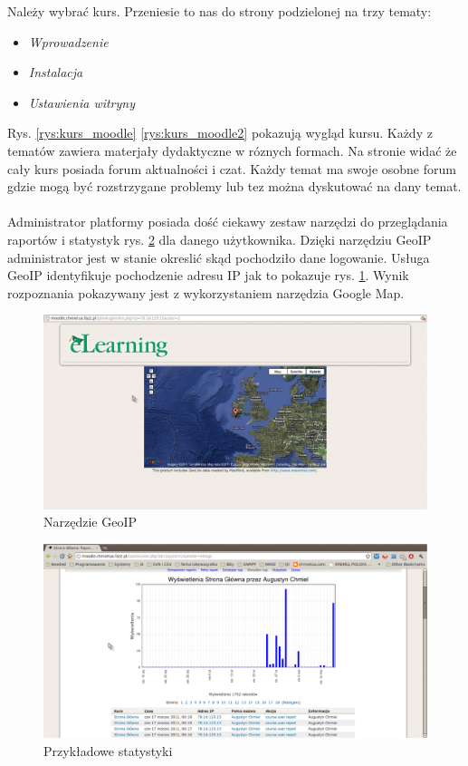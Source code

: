 Należy wybrać kurs. Przeniesie to nas do strony podzielonej na trzy tematy:
\begin{itemize}
	\item \textit{Wprowadzenie}
	\item \textit{Instalacja}
	\item \textit{Ustawienia witryny}
\end{itemize}
Rys. \ref{rys:kurs_moodle} \ref{rys:kurs_moodle2} pokazują wygląd kursu. Każdy z tematów zawiera materjały dydaktyczne w róznych formach. Na stronie widać że cały kurs posiada forum aktualności i czat. Każdy temat ma swoje osobne forum gdzie mogą być rozstrzygane problemy lub tez można dyskutować na dany temat. \\
\ \\
Administrator platformy posiada dość ciekawy zestaw narzędzi do przeglądania raportów i statystyk rys. \ref{rys:stat} dla danego użytkownika. Dzięki narzędziu GeoIP administrator jest w stanie okreslić skąd pochodziło dane logowanie. Usługa GeoIP identyfikuje pochodzenie adresu IP jak to pokazuje rys. \ref{rys:geoip}. Wynik rozpoznania pokazywany jest z wykorzystaniem narzędzia Google Map.
\begin{figure}[!h]
	\centering
		\caption{Narzędzie GeoIP} \label{rys:geoip}
		\includegraphics[width=1\textwidth]{projekt_sys//rys//geoip.eps}
\end{figure}
\begin{figure}[!h]
	\centering
		\caption{Przykładowe statystyki} \label{rys:stat}
		\includegraphics[width=1\textwidth]{projekt_sys//rys//stat.eps}
\end{figure}
